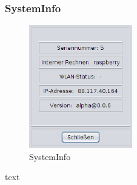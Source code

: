 \subsubsection{SystemInfo}
\begin{figure}
\vspace{-20pt}
  \begin{center}
    \includegraphics[width=0.40\textwidth]{Bilder/GUI/SystemInfo}
  \end{center}
  \caption{SystemInfo}
  \label{SystemInfo}
  \vspace{-10pt}
\end{figure}   
  text

\newpage

